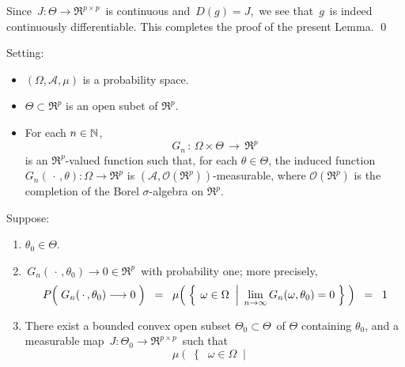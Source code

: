 \vskip 0.5cm
\noindent
Since \,$J : \Theta \longrightarrow \Re^{p \times p}$\, is continuous and \,$D(g) = J$,\,
we see that \,$g$\, is indeed continuously differentiable.
This completes the proof of the present Lemma.
\qed


\vskip 0.5cm
\begin{lemma}
\mbox{}\vskip 0.1cm
\noindent
Setting:
\begin{itemize}
\item
	$(\Omega,\mathcal{A},\mu)$ is a probability space.
\item
	$\Theta \subset \Re^{p}$ is an open subet of $\Re^{p}$.
\item
	For each $n \in \mathbb{N}$,
	\begin{equation*}
	G_{n} \, : \, \Omega \times \Theta \, \longrightarrow \, \Re^{p}
	\end{equation*}
	is an $\Re^{p}$-valued function such that, for each $\theta \in \Theta$,
	the induced function $G_{n}(\,\cdot\,,\theta) : \Omega \longrightarrow \Re^{p}$
	is $(\mathcal{A},\mathcal{O}(\Re^{p}))$-measurable, where
	$\mathcal{O}(\Re^{p})$ is the completion of
	the Borel $\sigma$-algebra on $\Re^{p}$.
\end{itemize}
\renewcommand{\theenumi}{\alph{enumi}}
\renewcommand{\labelenumi}{\textnormal{(\theenumi)}$\;\;$}
Suppose:
\begin{enumerate}
\item
	$\theta_{0} \in \Theta$.
\item
	\,$G_{n}(\,\cdot\,,\theta_{0}) \longrightarrow 0\in\Re^{p}$\, with probability one; more precisely,
	\begin{equation*}
	P\!\left(\;
		G_{n}(\,\cdot\,,\theta_{0}) \overset{{\color{white}-}}{\longrightarrow} 0
		\;\right)
	\;\; = \;\;
		\mu\!\left(\;\left\{\;
			\left.
			\omega \overset{{\color{white}.}}{\in} \Omega
			\;\;\right\vert\;
			\underset{n\rightarrow\infty}{\lim}\,G_{n}(\omega,\theta_{0}) = 0
			\;\right\}\;\right)
	\;\; = \;\;
		1
	\end{equation*}
\item
	There exist a bounded convex open subset \;$\Theta_{0} \subset \Theta$\, of \;$\Theta$ containing $\theta_{0}$,
	and a measurable map
	\,$J : \Theta_{0} \longrightarrow \Re^{p \times p}$\,
	such that %
	\begin{equation*}
	\mu\!\left(\;\left\{\;\;
		\omega \in \Omega
		\;\;\left\vert\;
		\begin{array}{c}

\end{array}
\end{equation*}
\end{enumerate}
\end{lemma}
